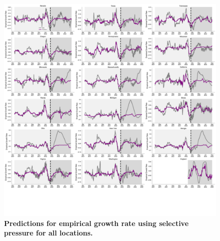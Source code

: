 \documentclass[11pt,oneside,letterpaper]{article}
\begin{document}
\begin{figure}[t!]
    \centering
    \includegraphics[width=0.9\textwidth=0.01]{./supplementary_figures/empirical-growth-rate-predictions-all.png}
    \caption{
        \textbf{Predictions for empirical growth rate using selective pressure for all locations.}
    }
    \label{fig:empirical-growth-rate-predictions-all}
\end{figure}
\end{document}
